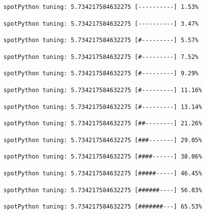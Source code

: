 \documentclass[
  letterpaper,
  DIV=11,
  numbers=noendperiod]{scrreprt}
\begin{document}
\begin{verbatim}
spotPython tuning: 5.734217584632275 [----------] 1.53% 
\end{verbatim}

\begin{verbatim}
spotPython tuning: 5.734217584632275 [----------] 3.47% 
\end{verbatim}

\begin{verbatim}
spotPython tuning: 5.734217584632275 [#---------] 5.57% 
\end{verbatim}

\begin{verbatim}
spotPython tuning: 5.734217584632275 [#---------] 7.52% 
\end{verbatim}

\begin{verbatim}
spotPython tuning: 5.734217584632275 [#---------] 9.29% 
\end{verbatim}

\begin{verbatim}
spotPython tuning: 5.734217584632275 [#---------] 11.16% 
\end{verbatim}

\begin{verbatim}
spotPython tuning: 5.734217584632275 [#---------] 13.14% 
\end{verbatim}

\begin{verbatim}
spotPython tuning: 5.734217584632275 [##--------] 21.26% 
\end{verbatim}

\begin{verbatim}
spotPython tuning: 5.734217584632275 [###-------] 29.05% 
\end{verbatim}

\begin{verbatim}
spotPython tuning: 5.734217584632275 [####------] 38.06% 
\end{verbatim}

\begin{verbatim}
spotPython tuning: 5.734217584632275 [#####-----] 46.45% 
\end{verbatim}

\begin{verbatim}
spotPython tuning: 5.734217584632275 [######----] 56.03% 
\end{verbatim}

\begin{verbatim}
spotPython tuning: 5.734217584632275 [#######---] 65.53% 
\end{verbatim}
\end{document}
